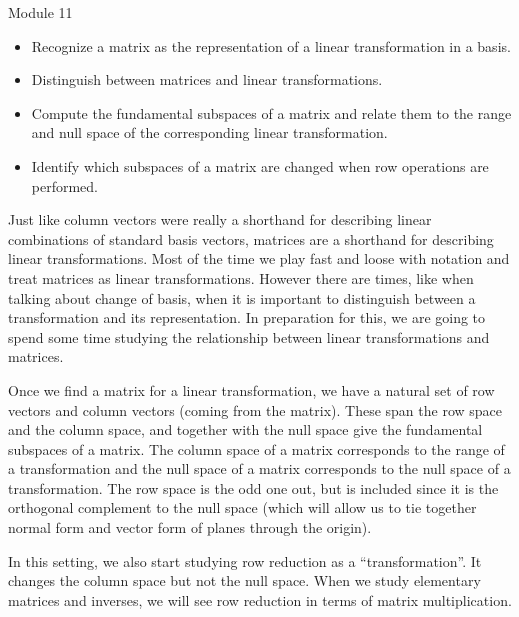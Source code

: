 \documentclass{workbook}
\begin{document}
\begin{lesson}

	Module 11

	\begin{itemize}
		\item Recognize a matrix as the representation of a linear transformation in a basis.
		\item Distinguish between matrices and linear transformations.
		\item Compute the fundamental subspaces of a matrix and relate them to the range and null space
			of the corresponding linear transformation.
		\item Identify which subspaces of a matrix are changed when row operations are performed.
	\end{itemize}

		Just like column vectors were really a shorthand for describing linear combinations
		of standard basis vectors,
		matrices are a shorthand for describing linear transformations. Most of the time we play fast
		and loose with notation and treat matrices as linear transformations. However there are times,
		like when talking about change of basis, when it is important to distinguish between
		a transformation and its representation. In preparation for this, we are going to spend some
		time studying the relationship between linear transformations and matrices.

		Once we find a matrix for a linear transformation, we have a natural set of row vectors and column
		vectors (coming from the matrix). These span the row space and the column space,
		and together with the null space give the fundamental subspaces of a matrix. The column space of
		a matrix corresponds to the range of a transformation and the null space of a matrix corresponds
		to the null space of a transformation. The row space is the odd one out, but is included since it is
		the orthogonal complement to the null space (which will allow us to tie together normal form and vector
		form of planes through the origin).

		In this setting, we also start studying row reduction as a ``transformation''. It changes
		the column space but not the null space. When we study elementary matrices and inverses, we will
		see row reduction in terms of matrix multiplication.

\end{lesson}
\end{document}
